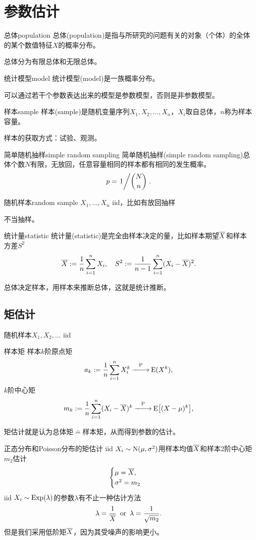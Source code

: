 \chapter{参数估计}

\begin{definition}{总体}{population}
	总体(population)是指与所研究的问题有关的对象（个体）的全体的某个数值特征$X$的概率分布。
\end{definition}
总体分为有限总体和无限总体。
\begin{definition}{统计模型}{model}
	统计模型(model)是一族概率分布。
\end{definition}
可以通过若干个参数表达出来的模型是参数模型，否则是非参数模型。
\begin{definition}{样本}{sample}
	样本(sample)是随机变量序列$X_1,X_2,\ldots,X_n$，$X_i$取自总体，$n$称为样本容量。
\end{definition}
样本的获取方式：试验、观测。
\begin{definition}{简单随机抽样}{simple random sampling}
	简单随机抽样(simple random sampling)总体个数$N$有限，无放回，任意容量相同的样本都有相同的发生概率。
	\[
		p=\left.{1}\middle/{\binom Nn}\right..
	\]
\end{definition}
\begin{definition}{随机样本}{random sample}
	$X_1,\ldots,X_n$ iid，比如有放回抽样
\end{definition}
不当抽样。
\begin{definition}{统计量}{statistic}
	统计量(statistic)是完全由样本决定的量，比如样本期望$\overline{X}$和样本方差$S^2$
	\[
		\overline{X}:=\frac1n\sum_{i=1}^nX_i,\quad S^2:=\frac1{n-1}\sum_{i=1}^n(X_i-\overline{X})^2.
	\]
\end{definition}
总体决定样本，用样本来推断总体，这就是统计推断。
\section{矩估计}
随机样本$X_1,X_2,\ldots$ iid
\begin{definition}{样本矩}{}
	样本$k$阶原点矩
	\[
		a_k:=\frac1n\sum_{i=1}^nX_i^k\overset{\operatorname{P}}{-\hspace{-4pt}-\hspace{-5pt}\longrightarrow}\operatorname{E}(X^k),
	\]
	$k$阶中心矩
	\[
		m_k:=\frac1n\sum_{i=1}^n(X_i-\overline{X})^k\overset{\operatorname{P}}{-\hspace{-4pt}-\hspace{-5pt}\longrightarrow}\operatorname{E}\bigl[(X-\mu)^k\bigr],
	\]
\end{definition}
矩估计就是认为总体矩$\doteq$样本矩，从而得到参数的估计。
\begin{example}{正态分布和Poisson分布的矩估计}{}
	iid $X_i\sim\operatorname{N}(\mu,\sigma^2)$用样本均值$\overline{X}$和样本2阶中心矩$m_2$估计
	\[
		\begin{cases}
			\mu=\overline{X},\\
			\sigma^2=m_2
		\end{cases}
	\]
	\tcblower
	iid $X_i\sim\operatorname{Exp}(\lambda)$的参数$\lambda$有不止一种估计方法
	\[
		\lambda=\frac1{\overline{X}}\enspace\text{or}\enspace\lambda=\frac1{\sqrt{m_2}}.
	\]
	但是我们采用低阶矩$\overline{X}$，因为其受噪声的影响更小。
\end{example}

